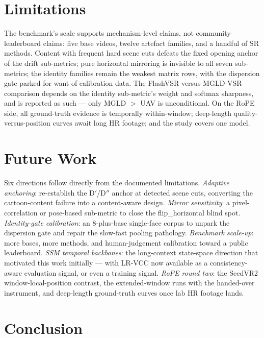 \section{Limitations}
\label{sec:conclusion:limitations}

The benchmark's scale supports mechanism-level claims, not community-leaderboard
claims: five base videos, twelve artefact families, and a handful of SR methods.
Content with frequent hard scene cuts defeats the fixed opening anchor of the
drift sub-metrics; pure horizontal mirroring is invisible to all seven
sub-metrics; the identity families remain the weakest matrix rows, with the
dispersion gate parked for want of calibration data. The
FlashVSR-versus-MGLD-VSR comparison depends on the identity sub-metric's weight
and softmax sharpness, and is reported as such --- only MGLD $>$ UAV is
unconditional. On the RoPE side, all ground-truth evidence is temporally
within-window; deep-length quality-versus-position curves await long HR footage;
and the study covers one model.

\section{Future Work}
\label{sec:conclusion:future}

Six directions follow directly from the documented limitations.
\emph{Adaptive anchoring}: re-establish the D$'$/D$''$ anchor at detected scene
cuts, converting the cartoon-content failure into a content-aware design.
\emph{Mirror sensitivity}: a pixel-correlation or pose-based sub-metric to close
the flip\_horizontal blind spot. \emph{Identity-gate calibration}: an
8-plus-base single-face corpus to unpark the dispersion gate and repair the
slow-fast pooling pathology. \emph{Benchmark scale-up}: more bases, more
methods, and human-judgement calibration toward a public leaderboard.
\emph{SSM temporal backbones}: the long-context state-space direction
\cite{po_longcontext_2025} that motivated this work initially --- with LR-VCC
now available as a consistency-aware evaluation signal, or even a training
signal. \emph{RoPE round two}: the SeedVR2 window-local-position contrast, the
extended-window runs with the handed-over instrument, and deep-length
ground-truth curves once lab HR footage lands.

\section{Conclusion}
\label{sec:conclusion:conclusion}

